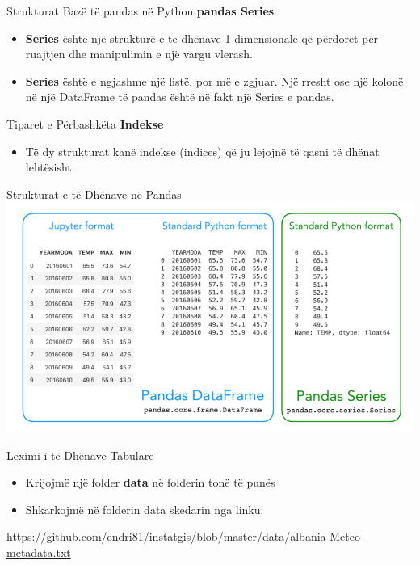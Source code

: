 \documentclass[
  ignorenonframetext,
]{beamer}
\providecommand{\tightlist}{%
  \setlength{\itemsep}{0pt}\setlength{\parskip}{0pt}}
\begin{document}
\begin{frame}{Strukturat Bazë të pandas në Python}
\protect\hypertarget{strukturat-bazuxeb-tuxeb-pandas-nuxeb-python-1}{}
\textbf{pandas Series}

\begin{itemize}
\item
  \textbf{Series} është një strukturë e të dhënave 1-dimensionale që
  përdoret për ruajtjen dhe manipulimin e një vargu vlerash.
\item
  \textbf{Series} është e ngjashme një listë, por më e zgjuar. Një
  rresht ose një kolonë në një DataFrame të pandas është në fakt një
  Series e pandas.
\end{itemize}
\end{frame}

\begin{frame}{Tiparet e Përbashkëta}
\protect\hypertarget{tiparet-e-puxebrbashkuxebta}{}
\textbf{Indekse}

\begin{itemize}
\tightlist
\item
  Të dy strukturat kanë indekse (indices) që ju lejojnë të qasni të
  dhënat lehtësisht.
\end{itemize}
\end{frame}

\begin{frame}{Strukturat e të Dhënave në Pandas}
\protect\hypertarget{strukturat-e-tuxeb-dhuxebnave-nuxeb-pandas-1}{}
\includegraphics{./Figs/panda1.png}
\end{frame}

\begin{frame}{Leximi i të Dhënave Tabulare}
\protect\hypertarget{leximi-i-tuxeb-dhuxebnave-tabulare}{}
\begin{itemize}
\item
  Krijojmë një folder \textbf{data} në folderin tonë të punës
\item
  Shkarkojmë në folderin data skedarin nga linku:
\end{itemize}

\url{https://github.com/endri81/instatgis/blob/master/data/albania-Meteo-metadata.txt}
\end{frame}
\end{document}
